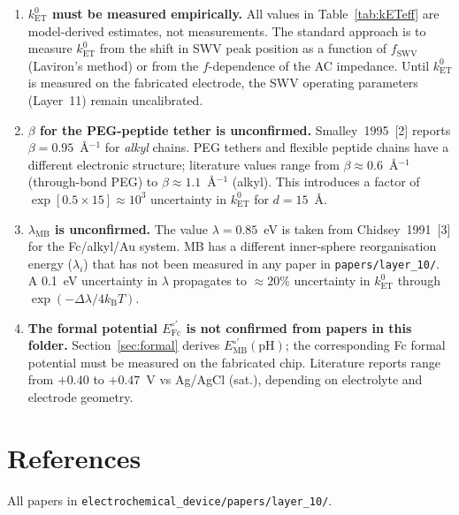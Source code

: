\documentclass[10pt,a4paper]{article}
\numberwithin{equation}{section}
\newcommand{\kET}{k_{\text{ET}}^{0}}
\newcommand{\cit}[1]{[#1]}
\newcommand{\Eo}{E^{\circ\prime}}
\newcommand{\kB}{k_{\text{B}}}
\begin{document}
\begin{enumerate}[leftmargin=*]

  \item \textbf{$\kET$ must be measured empirically.}
    All values in Table~\ref{tab:kETeff} are model-derived estimates,
    not measurements. The standard approach is to measure $\kET$
    from the shift in SWV peak position as a function of $f_{\text{SWV}}$
    (Laviron's method) or from the $f$-dependence of the AC impedance.
    Until $\kET$ is measured on the fabricated electrode, the SWV
    operating parameters (Layer~11) remain uncalibrated.

  \item \textbf{$\beta$ for the PEG-peptide tether is unconfirmed.}
    Smalley~1995~\cit{2} reports $\beta = 0.95$~\AA$^{-1}$ for
    \textit{alkyl} chains. PEG tethers and flexible peptide chains
    have a different electronic structure; literature values range
    from $\beta \approx 0.6$~\AA$^{-1}$ (through-bond PEG) to
    $\beta \approx 1.1$~\AA$^{-1}$ (alkyl). This introduces a
    factor of $\exp[0.5 \times 15] \approx 10^3$ uncertainty in
    $\kET$ for $d = 15$~\AA.

  \item \textbf{$\lambda_{\text{MB}}$ is unconfirmed.}
    The value $\lambda = 0.85$~eV is taken from Chidsey~1991~\cit{3}
    for the Fc/alkyl/Au system. MB has a different inner-sphere
    reorganisation energy ($\lambda_i$) that has not been measured
    in any paper in \texttt{papers/layer\_10/}. A 0.1~eV uncertainty
    in $\lambda$ propagates to $\approx 20\%$ uncertainty in $\kET$
    through $\exp(-\Delta\lambda/4\kB T)$.

  \item \textbf{The formal potential $\Eo_{\text{Fc}}$ is not confirmed
    from papers in this folder.}
    Section~\ref{sec:formal} derives $\Eo_{\text{MB}}(\text{pH})$;
    the corresponding Fc formal potential must be measured on the
    fabricated chip. Literature reports range from $+0.40$ to
    $+0.47$~V vs Ag/AgCl (sat.), depending on electrolyte and
    electrode geometry.

\end{enumerate}

\section*{References}

\noindent All papers in \texttt{electrochemical\_device/papers/layer\_10/}.
\end{document}
